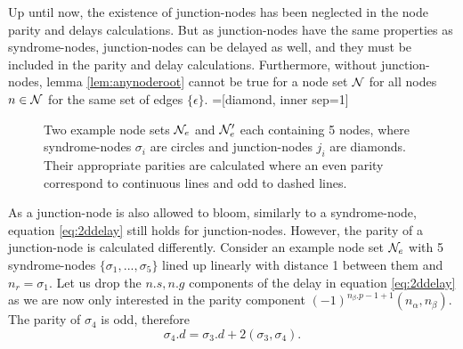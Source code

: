 Up until now, the existence of junction-nodes has been neglected in the node parity and delays calculations. But as junction-nodes have the same properties as syndrome-nodes, junction-nodes can be delayed as well, and they must be included in the parity and delay calculations. Furthermore, without junction-nodes, lemma \ref{lem:anynoderoot} cannot be true for a node set $\mathcal{N}$ for all nodes $n \in \mathcal{N}$ for the same set of edges $\{\epsilon\}$.
=[diamond, inner sep=1]
\begin{figure}
  \centering
  \caption{Two example node sets $\mathcal{N}_e$ and $\mathcal{N}_e'$ each containing 5 nodes, where syndrome-nodes $\sigma_i$ are circles and junction-nodes $j_i$ are diamonds. Their appropriate parities are calculated where an even parity correspond to continuous lines and odd to dashed lines. }\label{fig:junctionparity}
\end{figure}
As a junction-node is also allowed to bloom, similarly to a syndrome-node, equation \eqref{eq:2ddelay} still holds for junction-nodes. However, the parity of a junction-node is calculated differently. Consider an example node set $\mathcal{N}_e$ with 5 syndrome-nodes $\{\sigma_1,...,\sigma_5\}$ lined up linearly with distance 1 between them and $n_r = \sigma_1$. Let us drop the $n.s, n.g$ components of the delay in equation \eqref{eq:2ddelay} as we are now only interested in the parity component $(-1)^{n_\beta.p-1+1}(n_\alpha, n_\beta)$. The parity of $\sigma_4$ is odd, therefore
\begin{equation*}
  \sigma_4.d = \sigma_3.d + 2(\sigma_3, \sigma_4).
\end{equation*}

